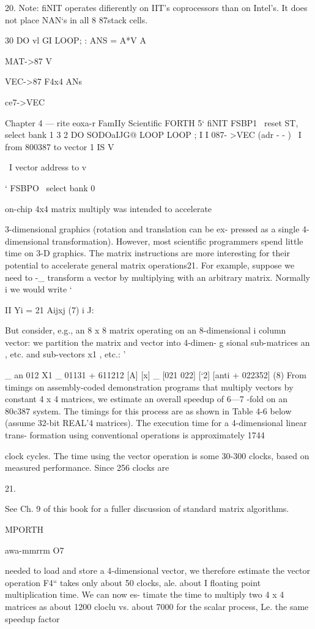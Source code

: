 {{{{{\begin{itemize}
{{{{{{{{{ 

20. Note: fiNIT operates difierently on IIT’s coprocessors than on Intel’s. It does not place NAN‘s
in all 8 87stack cells.

30 DO v{l} GI LOOP;
\example: ANS = A*V
A{{ MAT->87 V{ VEC->87 F4x4 ANs{ce7->VEC

Chapter 4 — rite eoxa-r FamIIy Scientific FORTH 5‘
fiNIT FSBP1 \ reset ST, select bank 1
3 2 DO
SODOa{{IJ}}G@ LOOP
LOOP ; I
I
087- >VEC (adr - - ) \ I from 800387 to vector 1
IS V{ \ I vector address to v{ ‘
FSBPO \ select bank 0 %

 

 on-chip 4x4 matrix multiply was intended to accelerate

3-dimensional graphics (rotation and translation can be ex-
pressed as a single 4-dimensional transformation). However, most
scientific programmers spend little time on 3-D graphics. The matrix
instructions are more interesting for their potential to accelerate
general matrix operations21. For example, suppose we need to -_
transform a vector by multiplying with an arbitrary matrix. Normally i
we would write ‘

   

II
Yi = 21 Aijxj (7) i
J:

But consider, e.g., an 8 x 8 matrix operating on an 8-dimensional i
column vector: we partition the matrix and vector into 4-dimen- g
sional sub-matrices an , etc. and sub-vectors x1 , etc.: '

_ an 012 X1 _ 01131 + 611212
[A] [x] _ [021 022] [‘2] [anti + 022352] (8)
From timings on assembly-coded demonstration programs that
multiply vectors by constant 4 x 4 matrices, we estimate an overall
speedup of 6—7 -fold on an 80c387 system. The timings for this
process are as shown in Table 4-6 below (assume 32-bit REAL'4
matrices). The execution time for a 4-dimensional linear trans-
formation using conventional operations is approximately 1744

clock cycles. The time using the vector operation is some 30-300
clocks, based on measured performance. Since 256 clocks are

 

21.

See Ch. 9 of this book for a fuller discussion of standard matrix algorithms.

MPORTH

awa-mmrrm O7

needed to load and store a 4-dimensional vector, we therefore
estimate the vector operation F4“ takes only about 50 clocks,
ale. about I floating point multiplication time. We can now es-
timate the time to multiply two 4 x 4 matrices as about 1200 cloclu
vs. about 7000 for the scalar process, Le. the same speedup factor

}}}}}}}}}}}}}}}
\end{itemize}}}}}}
